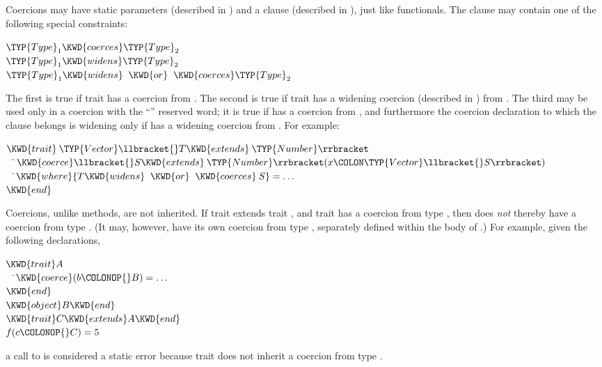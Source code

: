 Coercions may have static parameters (described in
) and a  clause (described in
), just like functionals.  The 
clause may contain one of the following special constraints:
\begin{Fortress}
\(\TYP{Type}_1 \KWD{coerces} \TYP{Type}_2\)\\
\(\TYP{Type}_1 \KWD{widens}  \TYP{Type}_2\)\\
\(\TYP{Type}_1 \KWD{widens}\;\;\KWD{or}\;\;\KWD{coerces} \TYP{Type}_2\)
\end{Fortress}
The first is true if trait  has a coercion from
.  The second is true if trait
 has a widening coercion (described in )
from .  The third may be used only in a coercion with
the ``'' reserved word; it is true if
 has a coercion from , and
furthermore the coercion declaration to which the  clause
belongs is widening only if  has a widening
coercion from .  For example:
\begin{Fortress}
\(\KWD{trait}\:\TYP{Vector}\llbracket{}T \KWD{extends}\:\TYP{Number}\rrbracket\)\\
{\tt~~}\pushtabs\=\+\(  \KWD{coerce}\llbracket{}S \KWD{extends}\:\TYP{Number}\rrbracket(x\COLON \TYP{Vector}\llbracket{}S\rrbracket)\)\\
{\tt~~}\pushtabs\=\+\(    \KWD{where} \{T \KWD{widens}\;\;\KWD{or}\;\;\KWD{coerces}\:S\} = \ldots\)\-\-\\\poptabs\poptabs
\(\KWD{end}\)
\end{Fortress}

Coercions, unlike methods, are not inherited.  If trait 
extends trait , and trait  has a coercion from type
, then  does \emph{not} thereby have a coercion from
type .  (It may, however, have its own coercion from type
, separately defined within the body of .)  For example,
given the following declarations,
%
\begin{Fortress}
\(\KWD{trait} A\)\\
{\tt~~}\pushtabs\=\+\(  \KWD{coerce}(b\COLONOP{}B) = \ldots\)\-\\\poptabs
\(\KWD{end}\)\\
\(\KWD{object} B \KWD{end}\)\\
\(\KWD{trait} C \KWD{extends} A \KWD{end}\)\\[4pt]
\(f(c\COLONOP{}C) = 5\)
\end{Fortress}
a call to  is considered a static error because trait
 does not inherit a coercion from type .



